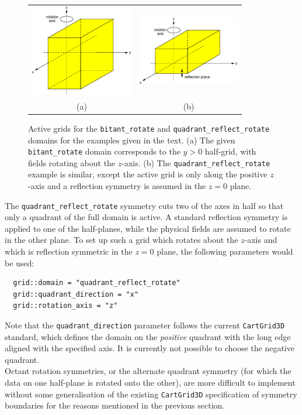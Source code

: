 \documentclass{article}
\newif\ifpdf
\begin{document}
\begin{figure}
\centering
\begin{tabular}{cc}
\ifpdf
\else
\includegraphics[height=40mm]{fig/rotate_bitant_example.eps}
\fi
&
\ifpdf
\else
\includegraphics[height=30mm]{fig/rotate_quadrant_example.eps}
\fi
\\
(a) & (b)
\end{tabular}
\caption{Active grids for the \texttt{bitant\_rotate} and
  \texttt{quadrant\_reflect\_rotate} domains for the examples given in
  the text. (a) The given \texttt{bitant\_rotate} domain corresponds
  to the $y>0$ half-grid, with fields rotating about the $z$-axis. (b)
  The \texttt{quadrant\_reflect\_rotate} example is similar, except
  the active grid is only along the positive $z$-axis and a reflection
  symmetry is assumed in the $z=0$ plane.}
\label{fig:rs_bitant_example}
\end{figure}

The \texttt{quadrant\_reflect\_rotate} symmetry cuts two of the axes
in half so that only a quadrant of the full domain is active. A
standard reflection symmetry is applied to one of the half-planes,
while the physical fields are assumed to rotate in the other plane. To
set up such a grid which rotates about the $z$-axis and which is
reflection symmetric in the $z=0$ plane, the following parameters
would be used:
\begin{verbatim}
  grid::domain = "quadrant_reflect_rotate"
  grid::quadrant_direction = "x"
  grid::rotation_axis = "z"
\end{verbatim}
Note that the \texttt{quadrant\_direction} parameter follows the
current \texttt{CartGrid3D} standard, which defines the domain on the
\emph{positive} quadrant with the long edge aligned with the specified
axis. It is currently not possible to choose the negative quadrant.\\

Octant rotation symmetries, or the alternate quadrant symmetry (for
which the data on one half-plane is rotated onto the other), are more
difficult to implement without some generalisation of the existing
\texttt{CartGrid3D} specification of symmetry boundaries for the
reasons mentioned in the previous section.

\end{document}
